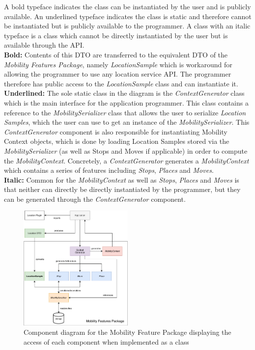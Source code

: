  A bold typeface indicates the class can be instantiated by the user and is publicly available. An underlined typeface indicates the class is static and therefore cannot be instantiated but is publicly available to the programmer. A class with an italic typeface is a class which cannot be directly instantiated by the user but is available through the API. \\
 
\textbf{Bold:} Contents of this DTO are transferred to the equivalent DTO of the \textit{Mobility Features Package}, namely \textit{LocationSample} which is workaround for allowing the programmer to use any location service API. The programmer therefore has public access to the \textit{LocationSample} class and can instantiate it.\\

\textbf{Underlined:} The sole static class in the diagram is the \textit{ContextGenerator} class which is the main interface for the application programmer. This class contains a reference to the \textit{MobilitySerializer} class that allows the user to serialize \textit{Location Samples}, which the user can use to get an instance of the \textit{MobilitySerializer}. This \textit{ContextGenerator} component is also responsible for instantiating  Mobility Context objects, which is done by loading Location Samples stored via the \textit{MobilitySerializer} (as well as Stops and Moves if applicable) in order to compute the \textit{MobilityContext}. Concretely, a \textit{ContextGenerator} generates a \textit{MobilityContext} which contains a series of features including \textit{Stops}, \textit{Places} and \textit{Moves}.\\

\textbf{Italic:} Common for the \textit{MobilityContext} as well as \textit{Stops}, \textit{Places} and \textit{Moves} is that neither can directly be directly instantiated by the programmer, but they can be generated through the \textit{ContextGenerator} component. \\

\begin{figure}[h]
    \centering
    \includegraphics[width=0.5\textwidth]{images/diagrams/api-diagram.pdf}
    \caption{Component diagram for the Mobility Feature Package displaying the access of each component when implemented as a class}
    \label{fig:component-diagram}
\end{figure}

